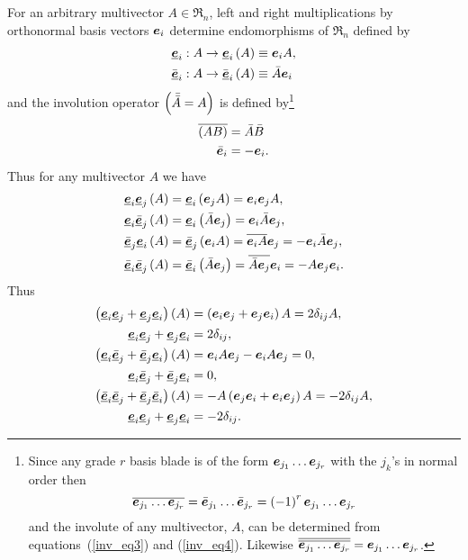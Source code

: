 For an arbitrary multivector $A\in \Re_{n}$, left and right multiplications by orthonormal basis vectors $\bm{e}_{i}$ determine
endomorphisms of $\Re_{n}$ defined by
\begin{align}
	\underline{\bm{e}}_{i}: A \rightarrow {\underline{\bm{e}}_{i}}\left ( {A} \right ) &\equiv \bm{e}_{i}A, \\
	\bar{\underline{\bm{e}}}_{i}: A \rightarrow {\bar{\underline{\bm{e}}}_{i}}\left ( {A} \right ) &\equiv \bar{A}\bm{e}_{i}
\end{align}
and the involution operator $\left ( {\bar{\bar{A}}=A} \right )$ is defined by\footnote{Since any grade $r$ basis blade is of the form $\bm{e}_{j_{1}}\ldots \bm{e}_{j_{r}}$
with the $j_{k}$'s in normal order then
\begin{equation*}
	\overline{\bm{e}_{j_{1}}\ldots \bm{e}_{j_{r}}} = \bar{\bm{e}}_{j_{1}}\ldots \bar{\bm{e}}_{j_{r}}  = \left ( {-1} \right )^{r}\bm{e}_{j_{1}}\ldots \bm{e}_{j_{r}}
\end{equation*}
and the involute of any multivector, $A$, can be determined from equations~(\ref{inv_eq3}) and (\ref{inv_eq4}).
Likewise $\overline{\overline{\bm{e}_{j_{1}}\ldots \bm{e}_{j_{r}}}}=\bm{e}_{j_{1}}\ldots \bm{e}_{j_{r}}$.}
\begin{align}
	\overline{\left ( {AB} \right )} &= \bar{A}\bar{B} \label{inv_eq3}\\
	\bar{\bm{e}}_{i} &= -\bm{e}_{i}.\label{inv_eq4}
\end{align}
Thus for any multivector $A$ we have
\begin{align}
	{\underline{\bm{e}}_{i}\underline{\bm{e}}_{j}}\left ( {A} \right ) &= {\underline{\bm{e}}_{i}}\left ( {\bm{e}_{j}A} \right ) = \bm{e}_{i}\bm{e}_{j}A, \\
	{\underline{\bm{e}}_{i}\underline{\bar{\bm{e}}}_{j}}\left ( {A} \right ) &= {\underline{\bm{e}}_{i}}\left ( {\bar{A}\bm{e}_{j}} \right ) = \bm{e}_{i}\bar{A}\bm{e}_{j}, \\
	{\underline{\bar{\bm{e}}}_{j}\underline{\bm{e}}_{i}}\left ( {A} \right ) &= {\underline{\bar{\bm{e}}}_{j}}\left ( {\bm{e}_{i}A} \right ) = \overline{\bm{e}_{i}A}\bm{e}_{j} = -\bm{e}_{i}\bar{A}\bm{e}_{j}, \\
	{\underline{\bar{\bm{e}}}_{i}\underline{\bar{\bm{e}}}_{j}}\left ( {A} \right ) &= {\underline{\bar{\bm{e}}}_{i}}\left ( {\bar{A}\bm{e}_{j}} \right ) = \overline{\bar{A}\bm{e}_{j}}\bm{e}_{i} =
	                                                   -A\bm{e}_{j}\bm{e}_{i}.
\end{align}
Thus
\begin{align}
	{\left ({\underline{\bm{e}}_{i}\underline{\bm{e}}_{j}+\underline{\bm{e}}_{j}\underline{\bm{e}}_{i}} \right )}\left ( {A} \right ) &= \left ( {\bm{e}_{i}\bm{e}_{j}+\bm{e}_{j}\bm{e}_{i}} \right ) A = 2\delta_{ij}A, \nonumber \\
	\underline{\bm{e}}_{i}\underline{\bm{e}}_{j}+\underline{\bm{e}}_{j}\underline{\bm{e}}_{i} &= 2\delta_{ij}, \label{Eeiej}\\
	{\left ( {\underline{\bm{e}}_{i}\underline{\bar{\bm{e}}}_{j}+\underline{\bar{\bm{e}}}_{j}\underline{\bm{e}}_{i}} \right )}\left ( {A} \right ) &= \bm{e}_{i}A\bm{e}_{j}-\bm{e}_{i}A\bm{e}_{j} = 0, \nonumber \\
	\underline{\bm{e}}_{i}\underline{\bar{\bm{e}}}_{j}+\underline{\bar{\bm{e}}}_{j}\underline{\bm{e}}_{i} &= 0, \label{Eeibej}\\	
	{\left ( {\underline{\bar{\bm{e}}}_{i}\underline{\bar{\bm{e}}}_{j}+\underline{\bar{\bm{e}}}_{j}\underline{\bar{\bm{e}}}_{i}} \right )}\left ( {A} \right ) &= 
	                              -A\left ( {\bm{e}_{j}\bm{e}_{i}+\bm{e}_{i}\bm{e}_{j}} \right ) A = -2\delta_{ij}A, \nonumber \\
	\underline{\bm{e}}_{i}\underline{\bm{e}}_{j}+\underline{\bm{e}}_{j}\underline{\bm{e}}_{i} &= -2\delta_{ij}.\label{Ebeibej}
\end{align}
